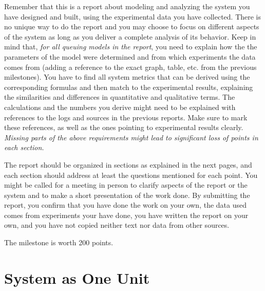 \documentclass[11pt]{article}
\begin{document}
Remember  that  this is  a  report  about modeling  and  analyzing the  system you  have  designed  and  built, using  the experimental data you have collected. There is no unique way to do the report and you may choose  to  focus  on  different  aspects  of  the  system  as  long  as  you deliver a  complete analysis of  its behavior. Keep in mind that, \emph{for all queuing models in the report}, you need to explain how the the parameters of the model were determined and from which experiments the data comes from (adding a reference to the exact graph, table, etc. from the previous milestones). You have to find all system metrics that can be derived using the corresponding formulas and then match to the experimental results, explaining the similarities and differences in quantitative and qualitative terms. The calculations and the numbers you derive might need to be explained with references to the logs and sources in the previous reports. Make sure to mark these references, as well as the ones pointing to experimental results clearly. \textit{Missing parts of the above requirements might lead to significant loss of points in each section.}

The report should be organized in sections as explained in the next pages, and each section should address at least the questions mentioned for each point. You might be called for a meeting in person to clarify aspects of the report or the system and to make a short presentation of the work done. By submitting the report, you  confirm  that  you  have  done  the  work  on  your  own,  the  data used comes  from  experiments  your have  done,  you  have  written  the  report  on  your  own,  and  you have  not  copied  neither text nor data from other sources.

\medskip
The milestone is worth 200 points. 


\pagebreak


\section{System as One Unit}\label{sec:system-one-unit}

\iffalse
Length: 1-2 pages

Build an M/M/1 model of your entire system based on the stability trace that you had to run for the first milestone. Explain the characteristics and behavior of the model built, and compare it with the experimental data (collected both outside and inside the middleware). Analyze the modeled and real-life behavior of the system (explain the similarities, the differences, and map them to aspects of the design or the experiments). Make sure to follow the model-related guidelines described in the Notes!
\fi
\end{document}
